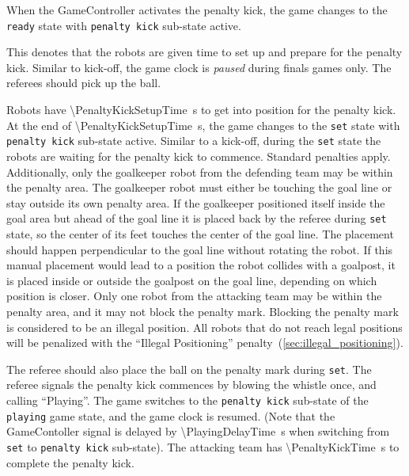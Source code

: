 When the GameController activates the penalty kick, the game changes to the \texttt{ready} state with \texttt{penalty kick} sub-state active.

This denotes that the robots are given time to set up and prepare for the penalty kick.
Similar to kick-off, the game clock is \textit{paused} during finals games only.
The referees should pick up the ball.

Robots have \qty{\PenaltyKickSetupTime}{\second} to get into position for the penalty kick.
At the end of \qty{\PenaltyKickSetupTime}{\second}, the game changes to the \texttt{set} state with \texttt{penalty kick} sub-state active.
Similar to a kick-off, during the \texttt{set} state the robots are waiting for the penalty kick to commence.
Standard penalties apply.
Additionally, only the goalkeeper robot from the defending team may be within the penalty area.
The goalkeeper robot must either be touching the goal line or stay outside its own penalty area.
If the goalkeeper positioned itself inside the goal area but ahead of the goal line it is placed back by the referee during \texttt{set} state, so the center of its feet touches the center of the goal line.
The placement should happen perpendicular to the goal line without rotating the robot.
If this manual placement would lead to a position the robot collides with a goalpost, it is placed inside or outside the goalpost on the goal line, depending on which position is closer.
Only one robot from the attacking team may be within the penalty area, and it may not block the penalty mark.
Blocking the penalty mark is considered to be an illegal position.
All robots that do not reach legal positions will be penalized with the ``Illegal Positioning'' penalty~(\cf \cref{sec:illegal_positioning}).

The referee should also place the ball on the penalty mark during \texttt{set}.
The referee signals the penalty kick commences by blowing the whistle once, and calling ``Playing''.
The game switches to the \texttt{penalty kick} sub-state of the \texttt{playing} game state, and the game clock is resumed.
(Note that the GameContoller signal is delayed by \qty{\PlayingDelayTime}{\second} when switching from \texttt{set} to \texttt{penalty kick} sub-state).
The attacking team has \qty{\PenaltyKickTime}{\second} to complete the penalty kick.

